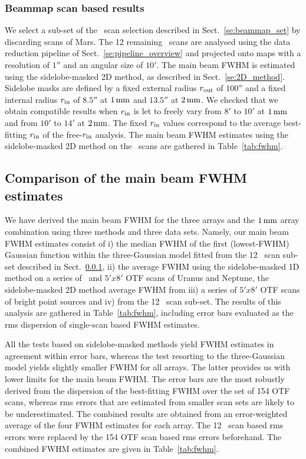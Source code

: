 \subsubsection{Beammap scan based results}
\label{se:mb_with_beammap}

We select a sub-set of the \bm\ scan selection described in
Sect.~\ref{se:beammap_set} by discarding scans of Mars.
The 12 remaining \bm\ scans are analysed using the data reduction
pipeline of Sect.~\ref{se:pipeline_overview} and projected onto maps
with a resolution of $1''$ and an angular size of $10'$.    
The main beam FWHM is estimated using the sidelobe-masked 2D method, as
described in Sect.~\ref{se:2D_method}. Sidelobe masks are
defined by a fixed external radius $r_{\rm{out}}$ of $100''$ and a
fixed internal radius $r_{\rm{in}}$ of $8.5''$ at $1\,\rm{mm}$ and
$13.5''$ at $2\,\rm{mm}$. We checked that we obtain compatible results when
$r_{\rm{in}}$ is let to freely vary from $8'$ to $10'$ at
$1\,\rm{mm}$ and from $10'$ to $14'$ at $2\,\rm{mm}$. The fixed
$r_{\rm{in}}$ values correspond to the average best-fitting
$r_{\rm{in}}$ of the free-$r_{\rm{in}}$ analysis. The main beam FWHM
estimates using the sidelobe-masked 2D method on the \bm\ scans are
gathered in Table~\ref{tab:fwhm}.


\subsection{Comparison of the main beam FWHM estimates}
\label{se:fwhm_results}

We have derived the main beam FWHM for the three arrays and the
$1\,\rm{mm}$ array combination using three methods and three data
sets. Namely, our main beam FWHM estimates
consist of i) the median FWHM of the first (lowest-FWHM) Gaussian
function within the three-Gaussian model fitted from the 12 \bm\ scan
sub-set described in
Sect.~\ref{se:mb_with_beammap}, ii) the average FWHM using the
sidelobe-masked 1D method on a series of \bm\ and $5'x8'$ OTF scans of
Uranus and Neptune, the sidelobe-masked 2D method average FWHM
from iii) a series of $5'x8'$ OTF scans of bright point sources and
iv) from the 12 \bm\ scan sub-set. The results of this analysis are
gathered in Table~\ref{tab:fwhm}, including error bars evaluated as
the rms dispersion of single-scan based FWHM estimates.

All the tests based on sidelobe-masked methods yield FWHM estimates
in agreement within error bars, whereas the test resorting to the
three-Gaussian model yields slightly smaller FWHM for all arrays. The
latter provides us with lower limits for the main beam FWHM. The error
bars are the most robustly derived from the dispersion of the
best-fitting FWHM over the set of 154 OTF scans, whereas rms errors
that are estimated from smaller scan sets are likely to be
underestimated. The combined results are obtained from an error-weighted
average of the four FWHM estimates for each array. The 12 \bm\ scan
based rms errors were replaced by the 154 OTF scan based rms errors
beforehand.
The combined FWHM estimates are given in Table~\ref{tab:fwhm}.

